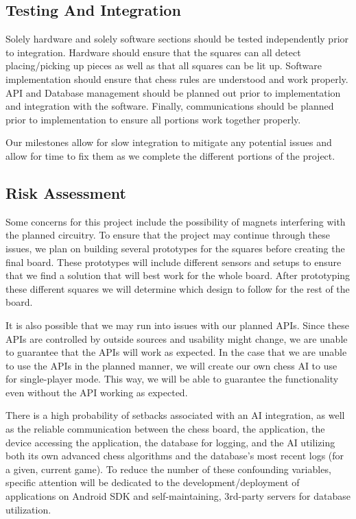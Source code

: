 \documentclass[11pt,journal]{IEEEtran}
\begin{document}
\subsection{Testing And Integration}
Solely hardware and solely software sections should be tested independently prior to integration. Hardware should ensure that the squares can all detect placing/picking up pieces as well as that all squares can be lit up. Software implementation should ensure that chess rules are understood and work properly. API and Database management should be planned out prior to implementation and integration with the software. Finally, communications should be planned prior to implementation to ensure all portions work together properly. 

Our milestones allow for slow integration to mitigate any potential issues and allow for time to fix them as we complete the different portions of the project. 

\subsection{Risk Assessment}
Some concerns for this project include the possibility of magnets interfering with the planned circuitry. To ensure that the project may continue through these issues, we plan on building several prototypes for the squares before creating the final board. These prototypes will include different sensors and setups to ensure that we find a solution that will best work for the whole board. After prototyping these different squares we will determine which design to follow for the rest of the board.

It is also possible that we may run into issues with our planned APIs. Since these APIs are controlled by outside sources and usability might change, we are unable to guarantee that the APIs will work as expected. In the case that we are unable to use the APIs in the planned manner, we will create our own chess AI to use for single-player mode. This way, we will be able to guarantee the functionality even without the API working as expected.

There is a high probability of setbacks associated with an AI integration, as well as the reliable communication between the chess board, the application, the device accessing the application, the database for logging, and the AI utilizing both its own advanced chess algorithms and the database's most recent logs (for a given, current game). To reduce the number of these confounding variables, specific attention will be dedicated to the development/deployment of applications on Android SDK and self-maintaining, 3rd-party servers for database utilization.
\end{document}
